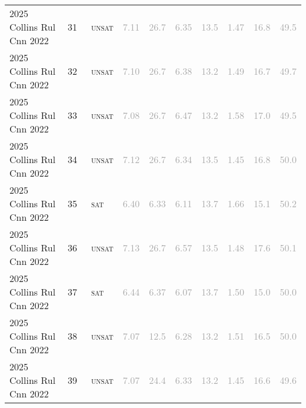 \begin{center}
{\begin{longtable}{@{}llllllllll@{}}
2025 Collins Rul Cnn 2022 & 31 & ~\textsc{unsat} & \textcolor{darkgray}{7.11} & \textcolor{darkgray}{26.7} & \textcolor{darkgray}{6.35} & \textcolor{darkgray}{13.5} & \textcolor{darkgray}{1.47} & \textcolor{darkgray}{16.8} & \textcolor{darkgray}{49.5} \\
2025 Collins Rul Cnn 2022 & 32 & ~\textsc{unsat} & \textcolor{darkgray}{7.10} & \textcolor{darkgray}{26.7} & \textcolor{darkgray}{6.38} & \textcolor{darkgray}{13.2} & \textcolor{darkgray}{1.49} & \textcolor{darkgray}{16.7} & \textcolor{darkgray}{49.7} \\
2025 Collins Rul Cnn 2022 & 33 & ~\textsc{unsat} & \textcolor{darkgray}{7.08} & \textcolor{darkgray}{26.7} & \textcolor{darkgray}{6.47} & \textcolor{darkgray}{13.2} & \textcolor{darkgray}{1.58} & \textcolor{darkgray}{17.0} & \textcolor{darkgray}{49.5} \\
2025 Collins Rul Cnn 2022 & 34 & ~\textsc{unsat} & \textcolor{darkgray}{7.12} & \textcolor{darkgray}{26.7} & \textcolor{darkgray}{6.34} & \textcolor{darkgray}{13.5} & \textcolor{darkgray}{1.45} & \textcolor{darkgray}{16.8} & \textcolor{darkgray}{50.0} \\
2025 Collins Rul Cnn 2022 & 35 & ~\textsc{sat} & \textcolor{darkgray}{6.40} & \textcolor{darkgray}{6.33} & \textcolor{darkgray}{6.11} & \textcolor{darkgray}{13.7} & \textcolor{darkgray}{1.66} & \textcolor{darkgray}{15.1} & \textcolor{darkgray}{50.2} \\
2025 Collins Rul Cnn 2022 & 36 & ~\textsc{unsat} & \textcolor{darkgray}{7.13} & \textcolor{darkgray}{26.7} & \textcolor{darkgray}{6.57} & \textcolor{darkgray}{13.5} & \textcolor{darkgray}{1.48} & \textcolor{darkgray}{17.6} & \textcolor{darkgray}{50.1} \\
2025 Collins Rul Cnn 2022 & 37 & ~\textsc{sat} & \textcolor{darkgray}{6.44} & \textcolor{darkgray}{6.37} & \textcolor{darkgray}{6.07} & \textcolor{darkgray}{13.7} & \textcolor{darkgray}{1.50} & \textcolor{darkgray}{15.0} & \textcolor{darkgray}{50.0} \\
2025 Collins Rul Cnn 2022 & 38 & ~\textsc{unsat} & \textcolor{darkgray}{7.07} & \textcolor{darkgray}{12.5} & \textcolor{darkgray}{6.28} & \textcolor{darkgray}{13.2} & \textcolor{darkgray}{1.51} & \textcolor{darkgray}{16.5} & \textcolor{darkgray}{50.0} \\
2025 Collins Rul Cnn 2022 & 39 & ~\textsc{unsat} & \textcolor{darkgray}{7.07} & \textcolor{darkgray}{24.4} & \textcolor{darkgray}{6.33} & \textcolor{darkgray}{13.2} & \textcolor{darkgray}{1.45} & \textcolor{darkgray}{16.6} & \textcolor{darkgray}{49.6} \\

\end{longtable}}
\end{center}
